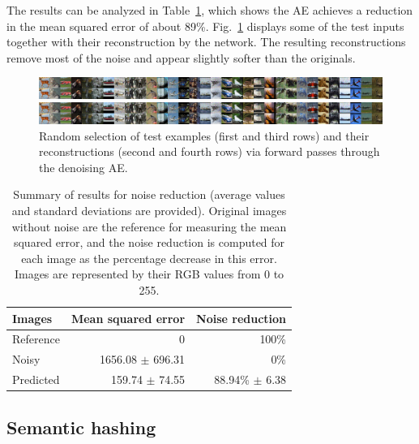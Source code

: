 The results can be analyzed in Table~\ref{p5tbl:noisered}, which shows the AE achieves a reduction in the mean squared error of about 89\%. Fig.~\ref{p5fig:denoised} displays some of the test inputs together with their reconstruction by the network. The resulting reconstructions remove most of the noise and appear slightly softer than the originals. 

\begin{figure}[ht]
    \centering
    \includegraphics[width=\linewidth,trim={768px 0 1536px 0},clip]{denoising-predictions.png}

    \includegraphics[width=\linewidth,trim={1536px 0 768px 0},clip]{denoising-predictions.png}
    \caption{\label{p5fig:denoised}Random selection of test examples (first and third rows) and their reconstructions (second and fourth rows) via forward passes through the denoising AE.}
\end{figure}

\begin{table}
    \centering
    \begin{tabular}{lrr}
        \toprule
            Images & Mean squared error & Noise reduction \\
        \midrule
        Reference & 0 & 100\% \\ 
        Noisy & 1656.08  $\pm$ 696.31 & 0\%\\
        Predicted &  159.74 $\pm$ 74.55 & 88.94\% $\pm$ 6.38\\
        \bottomrule
    \end{tabular}

    \caption{\label{p5tbl:noisered}Summary of results for noise reduction (average values and standard deviations are provided). Original images without noise are the reference for measuring the mean squared error, and the noise reduction is computed for each image as the percentage decrease in this error. Images are represented by their RGB values from 0 to 255.}
\end{table}


\subsection{Semantic hashing}

